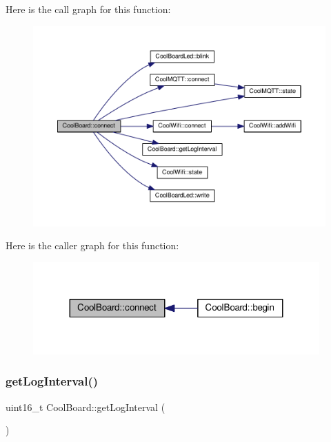 Here is the call graph for this function\+:
\nopagebreak
\begin{figure}[H]
\begin{center}
\leavevmode
\includegraphics[width=350pt]{classCoolBoard_a519de78b807f8ec6463ff484eb925918_cgraph}
\end{center}
\end{figure}
Here is the caller graph for this function\+:\nopagebreak
\begin{figure}[H]
\begin{center}
\leavevmode
\includegraphics[width=311pt]{classCoolBoard_a519de78b807f8ec6463ff484eb925918_icgraph}
\end{center}
\end{figure}
\mbox{\label{classCoolBoard_aaa24480b273fc095a1356a589c333781}} 
\subsubsection{\texorpdfstring{get\+Log\+Interval()}{getLogInterval()}}
{\footnotesize\ttfamily uint16\+\_\+t Cool\+Board\+::get\+Log\+Interval (\begin{DoxyParamCaption}{ }\end{DoxyParamCaption})}


